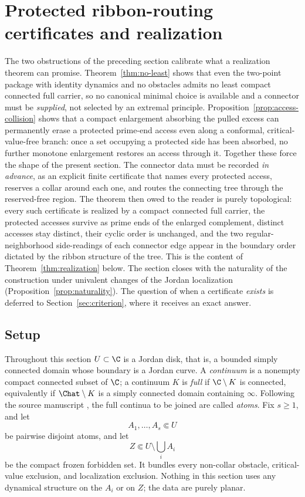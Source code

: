 
\section{Protected ribbon-routing certificates and realization}
\label{sec:certificates}

The two obstructions of the preceding section calibrate what a realization
theorem can promise.  Theorem~\ref{thm:no-least} shows that even the
two-point package with identity dynamics and no obstacles admits no least
compact connected full carrier, so no canonical minimal choice is available
and a connector must be \emph{supplied}, not selected by an extremal
principle.  Proposition~\ref{prop:access-collision} shows that a compact
enlargement absorbing the pulled excess can permanently erase a protected prime-end
access even along a conformal, critical-value-free branch: once a set
occupying a protected side has been absorbed, no further monotone
enlargement restores an access through it.  Together these force the shape
of the present section.  The connector data must be recorded \emph{in
advance}, as an explicit finite certificate that names every protected
access, reserves a collar around each one, and routes the connecting tree
through the reserved-free region.  The theorem then owed to the reader is
purely topological: every such certificate is realized by a compact
connected full carrier, the protected accesses survive as prime ends of the
enlarged complement, distinct accesses stay distinct, their cyclic order is
unchanged, and the two regular-neighborhood side-readings of each connector
edge appear in the boundary order dictated by the ribbon structure of the
tree.  This is the
content of Theorem~\ref{thm:realization} below.  The section closes with
the naturality of the construction under univalent changes of the Jordan
localization (Proposition~\ref{prop:naturality}).  The question of when a
certificate \emph{exists} is deferred to
Section~\ref{sec:criterion}, where it receives an exact answer.

\subsection*{Setup}
Throughout this section $U\subset\C$ is a Jordan disk, that is, a bounded
simply connected domain whose boundary is a Jordan curve.  A
\emph{continuum} is a nonempty compact connected subset of $\C$; a
continuum $K$ is \emph{full} if $\C\setminus K$ is connected, equivalently
if $\Chat\setminus K$ is a simply connected domain containing $\infty$.
Following the source manuscript \cite{MWman}, the full continua to be
joined are called \emph{atoms}.  Fix $s\ge1$, and let
\[
A_1,\dots,A_s\Subset U
\]
be pairwise disjoint atoms, and let
\[
Z\Subset U\setminus\bigcup_{i}A_i
\]
be the compact frozen forbidden set.  It bundles every non-collar
obstacle, critical-value exclusion, and localization exclusion.  Nothing
in this section uses any dynamical structure
on the $A_i$ or on $Z$; the data are purely planar.

